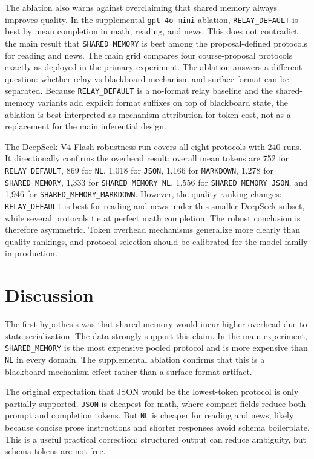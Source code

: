 \documentclass[11pt]{article}
\newcommand{\NL}{\texttt{NL}\xspace}
\newcommand{\MD}{\texttt{MARKDOWN}\xspace}
\newcommand{\JS}{\texttt{JSON}\xspace}
\newcommand{\SM}{\texttt{SHARED\_MEMORY}\xspace}
\newcommand{\RD}{\texttt{RELAY\_DEFAULT}\xspace}
\newcommand{\SMJ}{\texttt{SHARED\_MEMORY\_JSON}\xspace}
\newcommand{\SMN}{\texttt{SHARED\_MEMORY\_NL}\xspace}
\newcommand{\SMM}{\texttt{SHARED\_MEMORY\_MARKDOWN}\xspace}
\begin{document}
The ablation also warns against overclaiming that shared memory always improves quality. In the supplemental \texttt{gpt-4o-mini} ablation, \RD is best by mean completion in math, reading, and news. This does not contradict the main result that \SM is best among the proposal-defined protocols for reading and news. The main grid compares four course-proposal protocols exactly as deployed in the primary experiment. The ablation answers a different question: whether relay-vs-blackboard mechanism and surface format can be separated. Because \RD is a no-format relay baseline and the shared-memory variants add explicit format suffixes on top of blackboard state, the ablation is best interpreted as mechanism attribution for token cost, not as a replacement for the main inferential design.

The DeepSeek V4 Flash robustness run covers all eight protocols with 240 runs. It directionally confirms the overhead result: overall mean tokens are 752 for \RD, 869 for \NL, 1,018 for \JS, 1,166 for \MD, 1,278 for \SM, 1,333 for \SMN, 1,556 for \SMJ, and 1,946 for \SMM. However, the quality ranking changes: \RD is best for reading and news under this smaller DeepSeek subset, while several protocols tie at perfect math completion. The robust conclusion is therefore asymmetric. Token overhead mechanisms generalize more clearly than quality rankings, and protocol selection should be calibrated for the model family in production.

\section{Discussion}

The first hypothesis was that shared memory would incur higher overhead due to state serialization. The data strongly support this claim. In the main experiment, \SM is the most expensive pooled protocol and is more expensive than \NL in every domain. The supplemental ablation confirms that this is a blackboard-mechanism effect rather than a surface-format artifact.

The original expectation that JSON would be the lowest-token protocol is only partially supported. \JS is cheapest for math, where compact fields reduce both prompt and completion tokens. But \NL is cheaper for reading and news, likely because concise prose instructions and shorter responses avoid schema boilerplate. This is a useful practical correction: structured output can reduce ambiguity, but schema tokens are not free.
\end{document}
